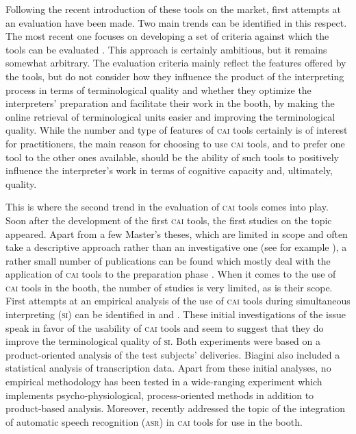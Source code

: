 \documentclass[output=paper]{langsci/langscibook}
\begin{document}
Following the recent introduction of these tools on the market, first attempts at an evaluation have been made. Two main trends can be identified in this respect. The most recent one focuses on developing a set of criteria against which the tools can be evaluated \citep{Costa2016, Will2015}. This approach is certainly ambitious, but it remains somewhat arbitrary. The evaluation criteria mainly reflect the features offered by the tools, but do not consider how they influence the product of the interpreting process in terms of terminological quality and whether they optimize the interpreters’ preparation and facilitate their work in the booth, by making the online retrieval of terminological units easier and improving the terminological quality. While the number and type of features of \textsc{cai} tools certainly is of interest for practitioners, the main reason for choosing to use \textsc{cai} tools, and to prefer one tool to the other ones available, should be the ability of such tools to positively influence the interpreter’s work in terms of cognitive capacity and, ultimately, quality. 

This is where the second trend in the evaluation of \textsc{cai} tools comes into play. Soon after the development of the first \textsc{cai} tools, the first studies on the topic appeared. Apart from a few Master’s theses, which are limited in scope and often take a descriptive approach rather than an investigative one (see for example \citealt{DeMerulis2013}), a rather small number of publications can be found which mostly deal with the application of \textsc{cai} tools to the preparation phase \citep{Xu2015, Fantinuoli2017a}. When it comes to the use of \textsc{cai} tools in the booth, the number of studies is very limited, as is their scope. First attempts at an empirical analysis of the use of \textsc{cai} tools during simultaneous interpreting (\textsc{si}) can be identified in \citet{Prandi2015a, Prandi2015b} and  \citet{Biagini2015}. These initial investigations of the issue speak in favor of the usability of \textsc{cai} tools and seem to suggest that they do improve the terminological quality of \textsc{si}. Both experiments were based on a product-oriented analysis of the test subjects’ deliveries. Biagini also included a statistical analysis of transcription data. Apart from these initial analyses, no empirical methodology has been tested in a wide-ranging experiment which implements psycho-physiological, process-oriented methods in addition to product-based analysis. Moreover, \citet{Fantinuoli2017b} recently addressed the topic of the integration of automatic speech recognition (\textsc{asr}) in \textsc{cai} tools for use in the booth.
\end{document}

